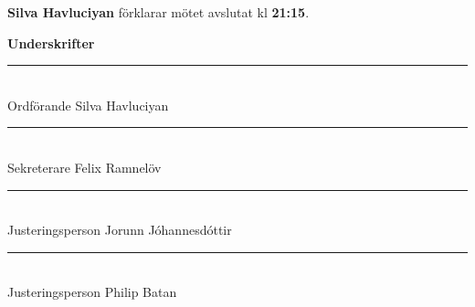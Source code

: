 \documentclass{datateknologsektionen-document}
\begin{document}
\textbf{Silva Havluciyan} förklarar mötet avslutat kl \textbf{21:15}.




\pagebreak
{\Large\bfseries Underskrifter}

\vspace*{1.2cm}
\noindent\rule{8cm}{1pt}\\
Ordförande Silva Havluciyan

\vspace*{1.2cm}
\noindent\rule{8cm}{1pt}\\
Sekreterare Felix Ramnelöv

\vspace*{1.2cm}
\noindent\rule{8cm}{1pt}\\
Justeringsperson Jorunn Jóhannesdóttir

\vspace*{1.2cm}
\noindent\rule{8cm}{1pt}\\
Justeringsperson Philip Batan
\end{document}
